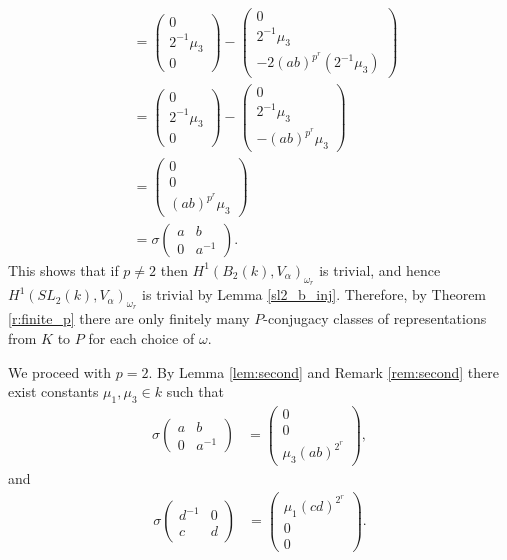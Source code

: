 \begin{align*}
	&=
	\left(\begin{matrix}0\\2^{-1}\mu_3\\0\end{matrix}\right)
	-
	\left(\begin{matrix}0\\2^{-1}\mu_3\\-2(ab)^{p^r} (2^{-1}\mu_3)\end{matrix}\right) \\
	&=\left(\begin{matrix}0\\2^{-1}\mu_3\\0\end{matrix}\right)
	-\left(\begin{matrix}0\\2^{-1}\mu_3\\-(ab)^{p^r}\mu_3\end{matrix}\right) \\
	&=\left(\begin{matrix}0\\0\\(ab)^{p^r}\mu_3\end{matrix}\right) \\
	&= \sigma\left(\begin{matrix}a & b\\0 & a^{-1}\end{matrix}\right).
\end{align*}
This shows that if $p\neq 2$ then $H^1(B_2(k), V_\alpha)_{\omega_r}$ is trivial, and hence $H^1(SL_2(k), V_\alpha)_{\omega_r}$ is trivial by Lemma \ref{sl2_b_inj}.
Therefore, by Theorem \ref{r:finite_p} there are only finitely many $P$-conjugacy classes of representations from $K$ to $P$ for each choice of $\omega$.

We proceed with $p=2$.
By Lemma \ref{lem:second} and Remark \ref{rem:second} there exist constants $\mu_1,\mu_3\in k$ such that
	\begin{align*}
	\sigma
			\left(\begin{matrix}a & b \\ 0 & a^{-1}\end{matrix}\right)
	&=
	\left(\begin{matrix}0 \\ 0 \\ \mu_3(ab)^{2^r}\end{matrix}\right),
	\end{align*}
and 
\begin{align*}
	\sigma\left(\begin{matrix}d^{-1} & 0 \\ c & d\end{matrix}\right)
	&=
	\left(\begin{matrix}\mu_1(cd)^{2^r}\\0\\0\end{matrix}\right).
	\end{align*}
	
